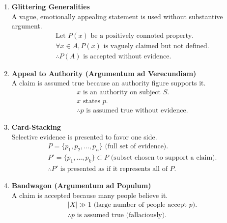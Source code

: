 \begin{enumerate}
    \item \textbf{Glittering Generalities}  \\
    A vague, emotionally appealing statement is used without substantive argument.
    \begin{align*}
        &\text{Let } P(x) \text{ be a positively connoted property.} \\
        &\forall x \in A, P(x) \text{ is vaguely claimed but not defined.} \\
        &\therefore P(A) \text{ is accepted without evidence.}
    \end{align*}

    \item \textbf{Appeal to Authority (Argumentum ad Verecundiam)}  \\
    A claim is assumed true because an authority figure supports it.
    \begin{align*}
        &x \text{ is an authority on subject } S. \\
        &x \text{ states } p. \\
        &\therefore p \text{ is assumed true without evidence.}
    \end{align*}

    \item \textbf{Card-Stacking}  \\
    Selective evidence is presented to favor one side.
    \begin{align*}
        &P = \{p_1, p_2, ..., p_n\} \text{ (full set of evidence).} \\
        &P' = \{p_1, ..., p_k\} \subset P \text{ (subset chosen to support a claim).} \\
        &\therefore P' \text{ is presented as if it represents all of } P.
    \end{align*}

    \item \textbf{Bandwagon (Argumentum ad Populum)}  \\
    A claim is accepted because many people believe it.
    \begin{align*}
        &|X| \gg 1 \text{ (large number of people accept } p). \\
        &\therefore p \text{ is assumed true (fallaciously).}
    \end{align*}

\end{enumerate}